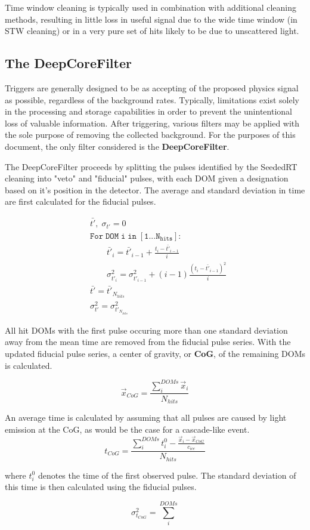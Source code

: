 Time window cleaning is typically used in combination with additional cleaning methods, resulting in little loss in useful signal due to the wide time window (in STW cleaning) or in a very pure set of hits likely to be due to unscattered light.


\subsection{The DeepCoreFilter}
Triggers are generally designed to be as accepting of the proposed physics signal as possible, regardless of the background rates.
Typically, limitations exist solely in the processing and storage capabilities in order to prevent the unintentional loss of valuable information.
After triggering, various filters may be applied with the sole purpose of removing the collected background.
For the purposes of this document, the only filter considered is the \textbf{DeepCoreFilter}.

The DeepCoreFilter proceeds by splitting the pulses identified by the SeededRT cleaning into "veto" and "fiducial" pulses, with each DOM given a designation based on it's position in the detector.
The average and standard deviation in time are first calculated for the fiducial pulses.

\begin{equation}
\begin{split}
	&\bar{t'},\; \sigma_{t'} = 0\\
	&\mathtt{For\; DOM\; i\; in\; [1...N_{hits}]:}\\
	&\qquad	\bar{t'}_i = \bar{t'}_{i-1} + \frac{t_i - \bar{t'}_{i-1}}{i}\\
	&\qquad	\sigma_{t'_i}^2 = \sigma_{t'_{i-1}}^2 + (i-1) \frac{\left(t_i - \bar{t'}_{i-1}\right)^2}{i}\\
	&\bar{t'} = \bar{t'}_{N_{hits}}\\
	&\sigma_{t'}^2 = \sigma_{t'_{N_{hits}}}^2
\end{split}
\end{equation}

All hit DOMs with the first pulse occuring more than one standard deviation away from the mean time are removed from the fiducial pulse series.
With the updated fiducial pulse series, a center of gravity, or \textbf{CoG}, of the remaining DOMs is calculated.

\begin{equation}
	\vec{x}_{CoG}=\frac{\sum_i^{DOMs} \vec{x}_i}{N_{hits}}
\end{equation}

An average time is calculated by assuming that all pulses are caused by light emission at the CoG, as would be the case for a cascade-like event.
\begin{equation}
	t_{CoG} = \frac{\sum_i^{DOMs} t_i^0 - \frac{\vec{x}_i - \vec{x}_{CoG}}{c_{ice}}}{N_{hits}}
\end{equation}

where $t_i^0$ denotes the time of the first observed pulse.
The standard deviation of this time is then calculated using the fiducial pulses.

\begin{equation}
	\sigma_{t_{CoG}}^2 = \sum_{i}^{DOMs} 
\end{equation}

